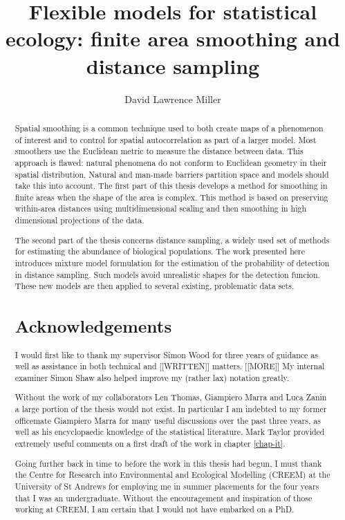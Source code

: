 \documentclass[12pt]{report}
\title{Flexible models for statistical ecology: finite area smoothing and distance sampling}
\author{David Lawrence Miller}
\begin{document}
\maketitle

\begin{abstract} 
Spatial smoothing is a common technique used to both create maps of a phenomenon of interest and to control for spatial autocorrelation as part of a larger model. Most smoothers use the Euclidean metric to measure the distance between data. This approach is flawed: natural phenomena do not conform to Euclidean geometry in their spatial distribution. Natural and man-made barriers partition space and models should take this into account. The first part of this thesis develops a method for smoothing in finite areas when the shape of the area is complex. This method is based on preserving within-area distances using multidimensional scaling and then smoothing in high dimensional projections of the data.

The second part of the thesis concerns distance sampling, a widely used set of methods for estimating the abundance of biological populations. The work presented here introduces mixture model formulation for the estimation of the probability of detection in distance sampling. Such models avoid unrealistic shapes for the detection funcion. These new models are then applied to several existing, problematic data sets.

\begin{center}
\section*{Acknowledgements}
\end{center}

I would first like to thank my supervisor Simon Wood for three years of guidance as well as assistance in both technical and [[WRITTEN]] matters. [[MORE]] My internal examiner Simon Shaw also helped improve my (rather lax) notation greatly.

Without the work of my collaborators Len Thomas, Giampiero Marra and Luca Zanin a large portion of the thesis would not exist. In particular I am indebted to my former officemate Giampiero Marra for many useful discussions over the past three years, as well as his encyclopaedic knowledge of the statistical literature. Mark Taylor provided extremely useful comments on a first draft of the work in chapter \ref{chap-it}.

Going further back in time to before the work in this thesis had begun, I must thank the Centre for Research into Environmental and Ecological Modelling (CREEM) at the University of St Andrews for employing me in summer placements for the four years that I was an undergraduate. Without the encouragement and inspiration of those working at CREEM, I am certain that I would not have embarked on a PhD.


\end{abstract}
\end{document}
